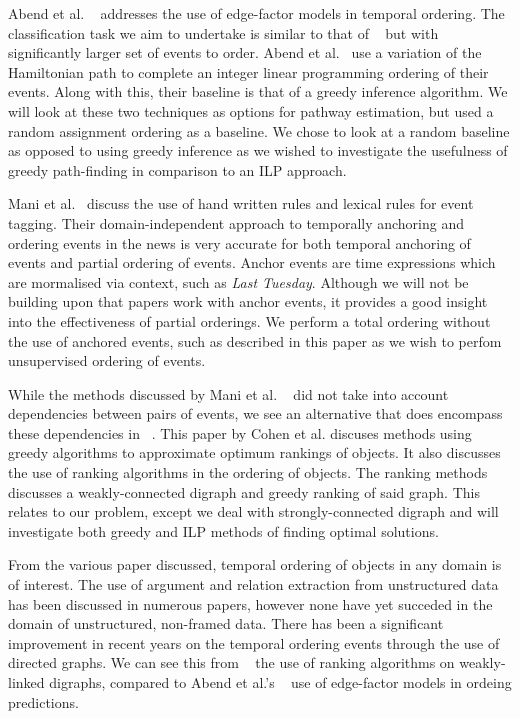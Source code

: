 \documentclass[bsc,frontabs,twoside,singlespacing,parskip,deptreport]{infthesis}     %
\begin{document}
Abend et al. ~\cite{abend2015lexical} addresses the use of
edge-factor models in temporal ordering. The classification task we aim to undertake is similar to that of ~\cite{abend2015lexical}
but with significantly larger set of events to order.
Abend et al.~\cite{abend2015lexical} use a variation of the Hamiltonian path
to complete an integer linear programming ordering of their events. Along with this, their baseline is that of a greedy inference algorithm.
We will look at these two techniques as options for pathway estimation, but used a random assignment ordering as
a baseline. We chose to look at a random baseline as opposed to using greedy inference as
we wished to investigate the usefulness of greedy path-finding in comparison to an ILP approach.

Mani et al.~\cite{mani2006machine} discuss the use of hand written rules and lexical rules for event tagging.
Their domain-independent approach to temporally anchoring and ordering events in the news is very accurate for both temporal
anchoring of events and partial ordering of events. Anchor events are time expressions which are mormalised via
context, such as \textit{Last Tuesday}. Although we will not be building upon that papers work with
anchor events, it provides a good insight into the effectiveness of
partial orderings. We perform a total ordering without the use of anchored events, such as described in this paper
as we wish to perfom unsupervised ordering of events.

While the methods discussed by Mani et al. ~\cite{mani2006machine} did not take into account dependencies between pairs of events, 
we see an alternative that does encompass
these dependencies in ~\cite{schapire1998learning}.
This paper by Cohen et al. discuses methods using greedy algorithms to approximate optimum rankings of objects.
It also discusses the use of ranking algorithms in the ordering of objects. The ranking methods discusses a
weakly-connected digraph and greedy ranking of said graph. This relates to our problem,
except we deal with strongly-connected digraph and will investigate both greedy and ILP methods of finding
optimal solutions.


From the various paper discussed, temporal ordering of objects in any domain is of interest.
The use of argument and relation extraction from unstructured data has been discussed in numerous papers,
however none have yet succeded in the domain of unstructured, non-framed data.
There has been a significant improvement in recent years on the temporal ordering events through the use of
directed graphs. We can see this from ~\cite{schapire1998learning} the use of ranking algorithms on weakly-linked
digraphs, compared to Abend et al.'s ~\cite{abend2015lexical} use of edge-factor models in ordeing predictions. 
\end{document}
